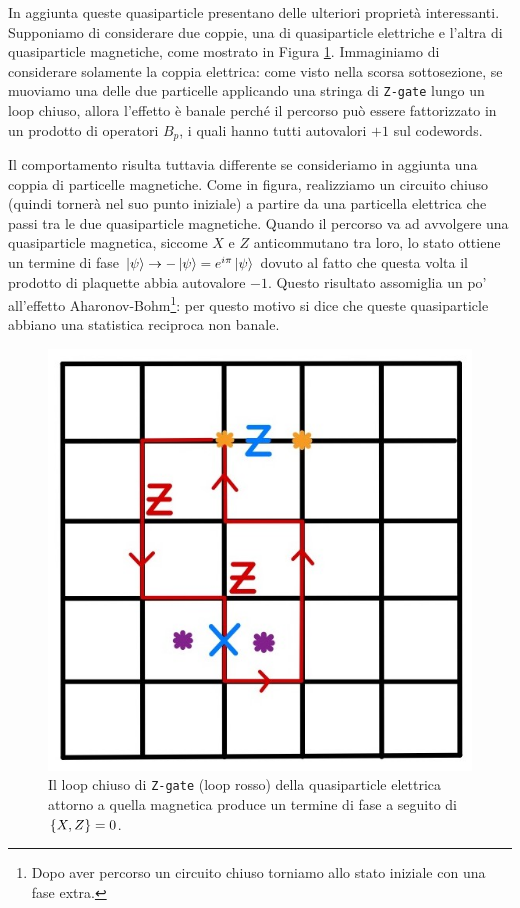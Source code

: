 \noindent In aggiunta queste quasiparticle presentano delle ulteriori proprietà interessanti. Supponiamo di considerare due coppie, una di quasiparticle elettriche e l'altra di quasiparticle magnetiche, come mostrato in Figura \ref{fig:z-path-around-x}. Immaginiamo di considerare solamente la coppia elettrica: come visto nella scorsa sottosezione, se muoviamo una delle due particelle applicando una stringa di \texttt{Z-gate} lungo un loop chiuso, allora l'effetto è banale perché il percorso può essere fattorizzato in un prodotto di operatori $B_p$, i quali hanno tutti autovalori $+1$ sul codewords. 

\noindent Il comportamento risulta tuttavia differente se consideriamo in aggiunta una coppia di particelle magnetiche. Come in figura, realizziamo un circuito chiuso (quindi tornerà nel suo punto iniziale) a partire da una particella elettrica che passi tra le due quasiparticle magnetiche. Quando il percorso va ad avvolgere una quasiparticle magnetica, siccome $X$ e $Z$ anticommutano tra loro, lo stato ottiene un termine di fase $ \ket{\psi} \to - \ket{\psi} =  e^{i\pi} \ket{\psi}$ dovuto al fatto che questa volta il prodotto di plaquette abbia autovalore $-1$. Questo risultato assomiglia un po' all'effetto Aharonov-Bohm\footnote{Dopo aver percorso un circuito chiuso torniamo allo stato iniziale con una fase extra.}: per questo motivo si dice che queste quasiparticle abbiano una statistica reciproca non banale.

\begin{figure}[!ht]
    \centering
    \includegraphics[scale=0.45]{images/z-path-around-x.jpg}
    \caption{Il loop chiuso di \texttt{Z-gate} (loop rosso) della quasiparticle elettrica attorno a quella magnetica produce un termine di fase a seguito di $\acomm{X}{Z} = 0$.}
    \label{fig:z-path-around-x}
\end{figure}


